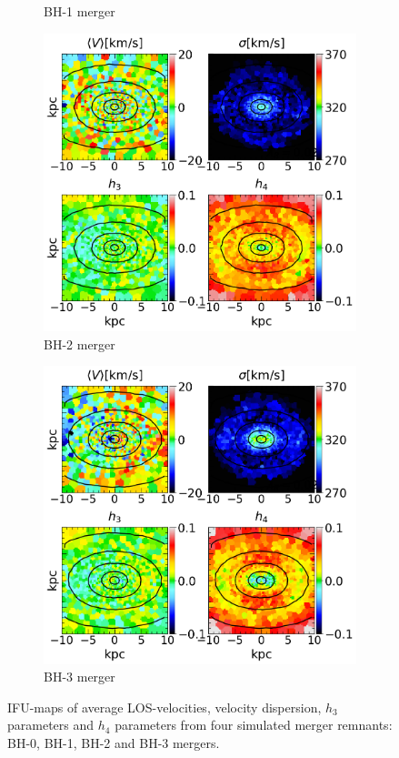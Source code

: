 \documentclass[english, oneside]{HYgradu}
\begin{document}
\begin{figure}
\begin{subfigure}[b]{0.49\textwidth}
		\caption{BH-1 merger}
	\end{subfigure}
	\begin{subfigure}[b]{0.49\textwidth}
		\includegraphics[width=\textwidth]{BH_2.png}
		\caption{BH-2 merger}
	\end{subfigure}
	\begin{subfigure}[b]{0.49\textwidth}
		\includegraphics[width=\textwidth]{BH_3.png}
		\caption{BH-3 merger}
	\end{subfigure}
	\caption{IFU-maps of average LOS-velocities, velocity dispersion, $h_3$ parameters and $h_4$ parameters from four simulated merger remnants: BH-0, BH-1, BH-2 and BH-3 mergers.}
	\label{figure:all_voronoi_1}
\end{figure}
\end{document}
